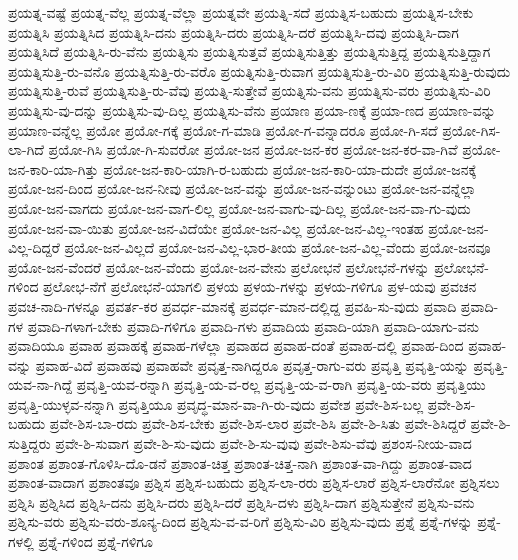 {ಪ್ರಯತ್ನ-ವಷ್ಟೆ
ಪ್ರಯತ್ನ-ವೆಲ್ಲ
ಪ್ರಯತ್ನ-ವೆಲ್ಲಾ
ಪ್ರಯತ್ನವೇ
ಪ್ರಯತ್ನಿ-ಸದೆ
ಪ್ರಯತ್ನಿಸ-ಬಹುದು
ಪ್ರಯತ್ನಿಸ-ಬೇಕು
ಪ್ರಯತ್ನಿಸಿ
ಪ್ರಯತ್ನಿಸಿದ
ಪ್ರಯತ್ನಿಸಿ-ದನು
ಪ್ರಯತ್ನಿಸಿ-ದರು
ಪ್ರಯತ್ನಿಸಿ-ದರೆ
ಪ್ರಯತ್ನಿಸಿ-ದವು
ಪ್ರಯತ್ನಿಸಿ-ದಾಗ
ಪ್ರಯತ್ನಿಸಿದೆ
ಪ್ರಯತ್ನಿಸಿ-ರು-ವೆನು
ಪ್ರಯತ್ನಿಸು
ಪ್ರಯತ್ನಿಸುತ್ತವೆ
ಪ್ರಯತ್ನಿಸುತ್ತಿತ್ತು
ಪ್ರಯತ್ನಿಸುತ್ತಿದ್ದ
ಪ್ರಯತ್ನಿಸುತ್ತಿದ್ದಾಗ
ಪ್ರಯತ್ನಿಸುತ್ತಿ-ರು-ವನೊ
ಪ್ರಯತ್ನಿಸುತ್ತಿ-ರು-ವರೊ
ಪ್ರಯತ್ನಿಸುತ್ತಿ-ರುವಾಗ
ಪ್ರಯತ್ನಿಸುತ್ತಿ-ರು-ವಿರಿ
ಪ್ರಯತ್ನಿಸುತ್ತಿ-ರುವುದು
ಪ್ರಯತ್ನಿಸುತ್ತಿ-ರುವೆ
ಪ್ರಯತ್ನಿಸುತ್ತಿ-ರು-ವೆವು
ಪ್ರಯತ್ನಿ-ಸುತ್ತೇವೆ
ಪ್ರಯತ್ನಿಸು-ವನು
ಪ್ರಯತ್ನಿಸು-ವರು
ಪ್ರಯತ್ನಿಸು-ವಿರಿ
ಪ್ರಯತ್ನಿಸು-ವು-ದನ್ನು
ಪ್ರಯತ್ನಿಸು-ವು-ದಿಲ್ಲ
ಪ್ರಯತ್ನಿಸು-ವೆನು
ಪ್ರಯಾಣ
ಪ್ರಯಾ-ಣಕ್ಕೆ
ಪ್ರಯಾ-ಣದ
ಪ್ರಯಾಣ-ವನ್ನು
ಪ್ರಯಾಣ-ವನ್ನೆಲ್ಲ
ಪ್ರಯೋ
ಪ್ರಯೋ-ಗಕ್ಕೆ
ಪ್ರಯೋ-ಗ-ಮಾಡಿ
ಪ್ರಯೋ-ಗ-ವನ್ನಾದರೂ
ಪ್ರಯೋ-ಗಿ-ಸದೆ
ಪ್ರಯೋ-ಗಿಸ-ಲಾ-ಗಿದೆ
ಪ್ರಯೋ-ಗಿಸಿ
ಪ್ರಯೋ-ಗಿ-ಸುವರೋ
ಪ್ರಯೋ-ಜನ
ಪ್ರಯೋ-ಜನ-ಕರ
ಪ್ರಯೋ-ಜನ-ಕರ-ವಾ-ಗಿವೆ
ಪ್ರಯೋ-ಜನ-ಕಾರಿ-ಯಾ-ಗಿತ್ತು
ಪ್ರಯೋ-ಜನ-ಕಾರಿ-ಯಾಗಿ-ರ-ಬಹುದು
ಪ್ರಯೋ-ಜನ-ಕಾರಿ-ಯಾ-ದುದೇ
ಪ್ರಯೋ-ಜನಕ್ಕೆ
ಪ್ರಯೋ-ಜನ-ದಿಂದ
ಪ್ರಯೋ-ಜನ-ನೀವು
ಪ್ರಯೋ-ಜನ-ವನ್ನು
ಪ್ರಯೋ-ಜನ-ವನ್ನುಂಟು
ಪ್ರಯೋ-ಜನ-ವನ್ನೆಲ್ಲಾ
ಪ್ರಯೋ-ಜನ-ವಾಗದು
ಪ್ರಯೋ-ಜನ-ವಾಗ-ಲಿಲ್ಲ
ಪ್ರಯೋ-ಜನ-ವಾಗು-ವು-ದಿಲ್ಲ
ಪ್ರಯೋ-ಜನ-ವಾ-ಗು-ವುದು
ಪ್ರಯೋ-ಜನ-ವಾ-ಯಿತು
ಪ್ರಯೋ-ಜನ-ವಿದೆಯೇ
ಪ್ರಯೋ-ಜನ-ವಿಲ್ಲ
ಪ್ರಯೋ-ಜನ-ವಿಲ್ಲ-ಇಂತಹ
ಪ್ರಯೋ-ಜನ-ವಿಲ್ಲ-ದಿದ್ದರೆ
ಪ್ರಯೋ-ಜನ-ವಿಲ್ಲದೆ
ಪ್ರಯೋ-ಜನ-ವಿಲ್ಲ-ಭಾರ-ತೀಯ
ಪ್ರಯೋ-ಜನ-ವಿಲ್ಲ-ವೆಂದು
ಪ್ರಯೋ-ಜನವೂ
ಪ್ರಯೋ-ಜನ-ವೆಂದರೆ
ಪ್ರಯೋ-ಜನ-ವೆಂದು
ಪ್ರಯೋ-ಜನ-ವೇನು
ಪ್ರಲೋಭನೆ
ಪ್ರಲೋಭನೆ-ಗಳನ್ನು
ಪ್ರಲೋಭನೆ-ಗಳಿಂದ
ಪ್ರಲೋಭ-ನೆಗೆ
ಪ್ರಲೋಭನೆ-ಯಾಗಲಿ
ಪ್ರಳಯ
ಪ್ರಳಯ-ಗಳನ್ನು
ಪ್ರಳಯ-ಗಳಿಗೂ
ಪ್ರಳ-ಯವು
ಪ್ರವಚನ
ಪ್ರವಚ-ನಾದಿ-ಗಳನ್ನೂ
ಪ್ರವರ್ತ-ಕರ
ಪ್ರವರ್ಧ-ಮಾನಕ್ಕೆ
ಪ್ರವರ್ಧ-ಮಾನ-ದಲ್ಲಿದ್ದ
ಪ್ರವಹಿ-ಸು-ವುದು
ಪ್ರವಾದಿ
ಪ್ರವಾದಿ-ಗಳ
ಪ್ರವಾದಿ-ಗಳಾಗ-ಬೇಕು
ಪ್ರವಾದಿ-ಗಳಿಗೂ
ಪ್ರವಾದಿ-ಗಳು
ಪ್ರವಾದಿಯ
ಪ್ರವಾದಿ-ಯಾಗಿ
ಪ್ರವಾದಿ-ಯಾಗು-ವನು
ಪ್ರವಾದಿಯೂ
ಪ್ರವಾಹ
ಪ್ರವಾಹಕ್ಕೆ
ಪ್ರವಾಹ-ಗಳೆಲ್ಲಾ
ಪ್ರವಾಹದ
ಪ್ರವಾಹ-ದಂತೆ
ಪ್ರವಾಹ-ದಲ್ಲಿ
ಪ್ರವಾಹ-ದಿಂದ
ಪ್ರವಾಹ-ವನ್ನು
ಪ್ರವಾಹ-ವಿದೆ
ಪ್ರವಾಹವು
ಪ್ರವಾಹವೇ
ಪ್ರವೃತ್ತ-ನಾಗಿದ್ದರೂ
ಪ್ರವೃತ್ತ-ರಾಗು-ವರು
ಪ್ರವೃತ್ತಿ
ಪ್ರವೃತ್ತಿ-ಯನ್ನು
ಪ್ರವೃತ್ತಿ-ಯವ-ನಾ-ಗಿದ್ದೆ
ಪ್ರವೃತ್ತಿ-ಯವ-ರನ್ನಾಗಿ
ಪ್ರವೃತ್ತಿ-ಯ-ವ-ರಲ್ಲ
ಪ್ರವೃತ್ತಿ-ಯ-ವ-ರಾಗಿ
ಪ್ರವೃತ್ತಿ-ಯ-ವರು
ಪ್ರವೃತ್ತಿಯು
ಪ್ರವೃತ್ತಿ-ಯುಳ್ಳವ-ನನ್ನಾಗಿ
ಪ್ರವೃತ್ತಿಯೂ
ಪ್ರವೃದ್ಧ-ಮಾನ-ವಾ-ಗಿ-ರು-ವುದು
ಪ್ರವೇಶ
ಪ್ರವೇ-ಶಿಸ-ಬಲ್ಲ
ಪ್ರವೇ-ಶಿಸ-ಬಹುದು
ಪ್ರವೇ-ಶಿಸ-ಬಾ-ರದು
ಪ್ರವೇ-ಶಿಸ-ಬೇಕು
ಪ್ರವೇ-ಶಿಸ-ಲಾರ
ಪ್ರವೇ-ಶಿಸಿ
ಪ್ರವೇ-ಶಿ-ಸಿತು
ಪ್ರವೇ-ಶಿಸಿದ್ದರೆ
ಪ್ರವೇ-ಶಿ-ಸುತ್ತಿದ್ದರು
ಪ್ರವೇ-ಶಿ-ಸುವಾಗ
ಪ್ರವೇ-ಶಿ-ಸು-ವುದು
ಪ್ರವೇ-ಶಿ-ಸು-ವುವು
ಪ್ರವೇ-ಶಿಸು-ವೆವು
ಪ್ರಶಂಸ-ನೀಯ-ವಾದ
ಪ್ರಶಾಂತ
ಪ್ರಶಾಂತ-ಗೊಳಿಸಿ-ದೊ-ಡನೆ
ಪ್ರಶಾಂತ-ಚಿತ್ತ
ಪ್ರಶಾಂತ-ಚಿತ್ತ-ನಾಗಿ
ಪ್ರಶಾಂತ-ವಾ-ಗಿದ್ದು
ಪ್ರಶಾಂತ-ವಾದ
ಪ್ರಶಾಂತ-ವಾದಾಗ
ಪ್ರಶಾಂತವೂ
ಪ್ರಶ್ನಿಸ
ಪ್ರಶ್ನಿಸ-ಬಹುದು
ಪ್ರಶ್ನಿಸ-ಲಾ-ರರು
ಪ್ರಶ್ನಿಸ-ಲಾರೆ
ಪ್ರಶ್ನಿಸ-ಲಾರೆನೋ
ಪ್ರಶ್ನಿಸಲು
ಪ್ರಶ್ನಿಸಿ
ಪ್ರಶ್ನಿಸಿದ
ಪ್ರಶ್ನಿಸಿ-ದನು
ಪ್ರಶ್ನಿಸಿ-ದರು
ಪ್ರಶ್ನಿಸಿ-ದರೆ
ಪ್ರಶ್ನಿಸಿ-ದಳು
ಪ್ರಶ್ನಿಸಿ-ದಾಗ
ಪ್ರಶ್ನಿಸುತ್ತೇನೆ
ಪ್ರಶ್ನಿಸು-ವನು
ಪ್ರಶ್ನಿಸು-ವರು
ಪ್ರಶ್ನಿಸು-ವರು-ಶೂನ್ಯ-ದಿಂದ
ಪ್ರಶ್ನಿಸು-ವ-ವ-ರಿಗೆ
ಪ್ರಶ್ನಿಸು-ವಿರಿ
ಪ್ರಶ್ನಿಸು-ವುದು
ಪ್ರಶ್ನೆ
ಪ್ರಶ್ನೆ-ಗಳನ್ನು
ಪ್ರಶ್ನೆ-ಗಳಲ್ಲಿ
ಪ್ರಶ್ನೆ-ಗಳಿಂದ
ಪ್ರಶ್ನೆ-ಗಳಿಗೂ
}
